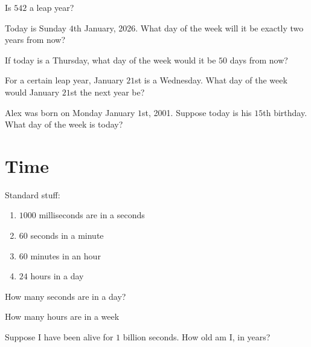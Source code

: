 \documentclass{article}
\theoremstyle{mytheoremstyle}
\theoremstyle{mytheoremstyle}
\theoremstyle{myproblemstyle}
\begin{document}
    \begin{problem}
        Is $542$ a leap year?        
    \end{problem}

    \begin{problem}
        Today is Sunday $4$th January, 2026. What day of the week will it be exactly two years from now?
    \end{problem}

    \begin{problem}
        If today is a Thursday, what day of the week would it be $50$ days from now?
    \end{problem}

    \begin{problem}
        For a certain leap year, January $21$st is a Wednesday. What day of the week would January $21$st the next year be?
    \end{problem}

    \begin{problem}
        Alex was born on Monday January $1$st, 2001. Suppose today is his $15$th birthday. What day of the week is today?
    \end{problem}



    \section{Time}
    Standard stuff:

    \begin{enumerate}
        \item $1000$ milliseconds are in a seconds
        \item $60$ seconds in a minute
        \item $60$ minutes in an hour
        \item $24$ hours in a day
    \end{enumerate}

    \begin{problem}
        How many seconds are in a day?
    \end{problem}

    \begin{problem}
        How many hours are in a week
    \end{problem}

    \begin{problem}
        Suppose I have been alive for $1$ billion seconds. How old am I, in years?
    \end{problem}
\end{document}
